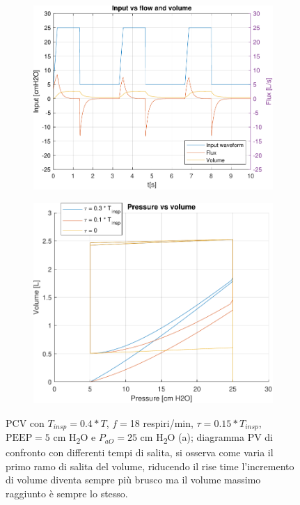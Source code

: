  \begin{figure}[t!]
	\begin{subfigure}{0.5\linewidth}
		\centering
\includegraphics[width=0.95\linewidth]{../model/data_log/data_square_wave_rise_15_Tinsp_40_PEEP_5_Paw_25_freq_18}
		\caption{}
	\end{subfigure}\hfill
	\begin{subfigure}{0.5\linewidth}
		\centering
\includegraphics[width=0.95\linewidth]{../model/data_log/PV_rise_time.pdf}
		\caption{}
	\end{subfigure}
	\caption{PCV con $T_{insp}=0.4*T$, $f=$18 respiri/min, $\tau=0.15*T_{insp}$, $\mathrm{PEEP}=5$ cm H\textsubscript{2}O e $P_{aO}=25$ cm H\textsubscript{2}O (a); diagramma PV di confronto con differenti tempi di salita, si osserva come varia il primo ramo di salita del volume, riducendo il rise time l'incremento di volume diventa sempre più brusco ma il volume massimo raggiunto è sempre lo stesso.}
	\label{fig:rise_time}
\end{figure}

